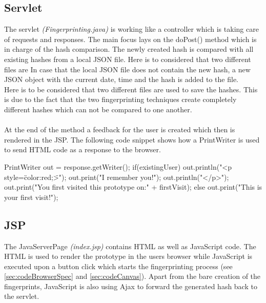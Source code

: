 \subsection{Servlet}
The servlet \textit{(Fingerprinting.java)} is working like a controller which is taking care of requests and responses. The main focus lays on the doPost() method which is in charge of the hash comparison. The newly created hash is compared with all existing hashes from a local JSON file. Here is to considered that two different files are In case that the local JSON file does not contain the new hash, a new JSON object with the current date, time and the hash is added to the file.\\
Here is to be considered that two different files are used to save the hashes. This is due to the fact that the two fingerprinting techniques create completely different hashes which can not be compared to one another.\\\\
At the end of the method a feedback for the user is created which then is rendered in the JSP. The following code snippet shows how a PrintWriter is used to send HTML code as a response to the browser.

\begin{JavaCode}
	PrintWriter out = response.getWriter();
	if(existingUser) {
		out.println("<p style=\"color:red;\">");			
		out.print("I remember you!");
		out.println("</p>");
		out.print("You first visited this prototype on:" + firstVisit);
	}
	else {
		out.print("This is your first visit!");
	}
\end{JavaCode}


\subsection{JSP}
The JavaServerPage \textit{(index.jsp)} contains HTML as well as JavaScript code. The HTML is used to render the prototype in the users browser while JavaScript is executed upon a button click which starts the fingerprinting process (see \autoref{sec:codeBrowserSpec} and \autoref{sec:codeCanvas}). Apart from the bare creation of the fingerprints, JavaScript is also using Ajax to forward the generated hash back to the servlet.\\

